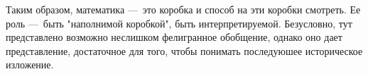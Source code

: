 \documentclass[math.tex]{subfiles}
\begin{document}
	Таким образом, математика —\ это коробка и способ на эти коробки смотреть. Ее роль —\ быть "наполнимой коробкой", быть интерпретируемой. Безусловно, тут представлено возможно неслишком фелигранное обобщение, однако оно дает представление, достаточное для того, чтобы понимать последуюшее историческое изложение.
	
\end{document}
